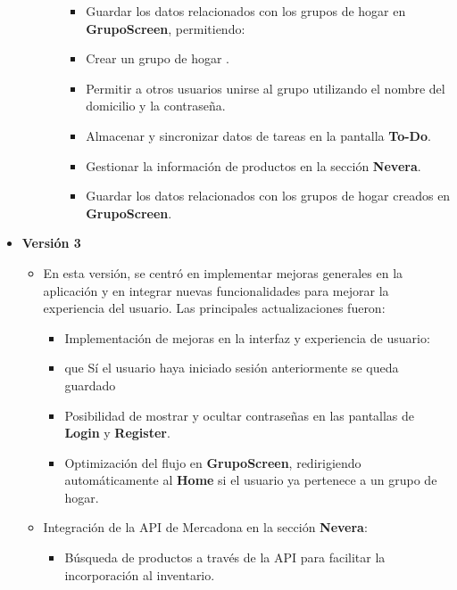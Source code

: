 \documentclass{article}
\begin{document}
\begin{flushleft}
\begin{itemize}
\begin{itemize}
\begin{itemize}
\begin{itemize}
                       \item Guardar los datos relacionados con los grupos de hogar en \textbf{GrupoScreen}, permitiendo:

                    \item Crear un grupo de hogar .
                    \item Permitir a otros usuarios unirse al grupo utilizando el nombre del domicilio y la contraseña.
                   
                \end{itemize}
        \begin{itemize}
            \item Almacenar y sincronizar datos de tareas en la pantalla \textbf{To-Do}.
            \item Gestionar la información de productos en la sección \textbf{Nevera}.
            \item Guardar los datos relacionados con los grupos de hogar creados en \textbf{GrupoScreen}.
        \end{itemize}
  
\end{itemize}

\end{itemize}

\item \textbf{Versión 3 }
\begin{itemize}
\item  En esta versión, se centró en implementar mejoras generales en la aplicación y en integrar nuevas funcionalidades para mejorar la experiencia del usuario. Las principales actualizaciones fueron:

\begin{itemize}
    \item Implementación de mejoras en la interfaz y experiencia de usuario:
            \item que Sí el usuario haya iniciado sesión anteriormente se queda guardado
            \item Posibilidad de mostrar y ocultar contraseñas en las pantallas de \textbf{Login} y \textbf{Register}.
            \item Optimización del flujo en \textbf{GrupoScreen}, redirigiendo automáticamente al \textbf{Home} si el usuario ya pertenece a un grupo de hogar.
        
        \end{itemize}
    \item Integración de la API de Mercadona en la sección \textbf{Nevera}:
        \begin{itemize}
            \item Búsqueda de productos a través de la API para facilitar la incorporación al inventario.
        \end{itemize}


\end{itemize}
\end{itemize}
\end{flushleft}
\end{document}
